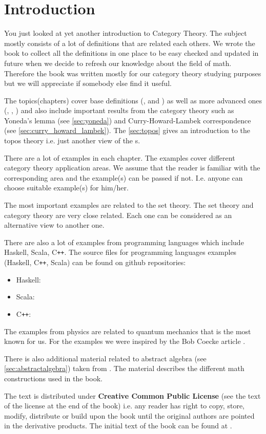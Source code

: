 \chapter*{Introduction}

You just looked at yet another introduction to Category Theory. The
subject mostly consists of a lot of definitions that are related each
others. We wrote the book to collect all the definitions in one
place to be easy checked and updated in future when we decide to refresh
our knowledge about the field of math. Therefore the book was written mostly
for our category theory studying purposes but we will appreciate if
somebody else find it useful. 

The topics(chapters) cover base definitions
(,  and
) as well as more advanced ones (,
, ) and also include important
results from the category theory such as Yoneda's lemma (see
\cref{sec:yoneda}) and Curry-Howard-Lambek correspondence (see
\cref{sec:curry_howard_lambek}). The \cref{sec:topos} gives an
introduction to the topos theory i.e. just another view of the
s.

There are a lot of examples in each chapter. The examples cover
different category 
theory application areas. We assume that the reader is familiar with
the corresponding area and the example(s) can be passed if not. I.e.
anyone can choose suitable example(s) for him/her. 

The most important examples are related to the set theory. The set
theory and category theory are very close related. Each one can be
considered as an alternative view to another one.

There are also a lot of examples from programming languages which include
Haskell, Scala, C\texttt{++}. The source files for programming languages 
examples (Haskell, C\texttt{++}, Scala) can be found on github repositories:
\begin{itemize}
\item Haskell: \cite{github:cattheory_hs_examples}
\item Scala: \cite{github:cattheory_scala_examples}
\item C\texttt{++}: \cite{github:cattheory_cpp_examples}
\end{itemize}

The examples from physics are related to quantum mechanics that is the
most known for us. For the examples we were inspired by the Bob Coecke
article \cite{bib:arxiv:Bob_Coecke_2008}.

There is also additional material related to abstract algebra (see
\cref{sec:abstractalgebra}) taken from
\cite{github:galois_ivanmurashko}. The material describes the
different math constructions used in the book.

The text is distributed under \textbf{Creative Common Public License}
(see the text of the license at the end of the book)
i.e. any reader has right to copy, store, modify, distribute or build
upon the book until the original authors are pointed in the derivative
products. The initial text of the book can be found at
\cite{github:cattheory_ivanmurashko}.  
